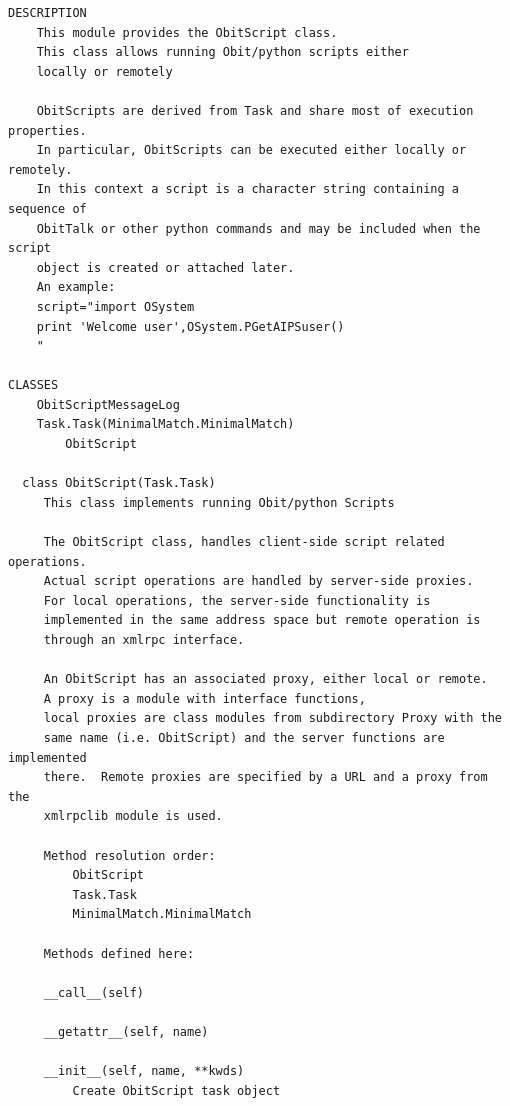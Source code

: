 \documentclass[11pt]{report}
\begin{document}
\begin{verbatim}
DESCRIPTION
    This module provides the ObitScript class.
    This class allows running Obit/python scripts either
    locally or remotely
    
    ObitScripts are derived from Task and share most of execution properties.
    In particular, ObitScripts can be executed either locally or remotely.
    In this context a script is a character string containing a sequence of
    ObitTalk or other python commands and may be included when the script
    object is created or attached later.
    An example:
    script="import OSystem
    print 'Welcome user',OSystem.PGetAIPSuser()
    "

CLASSES
    ObitScriptMessageLog
    Task.Task(MinimalMatch.MinimalMatch)
        ObitScript
    
  class ObitScript(Task.Task)
     This class implements running Obit/python Scripts
     
     The ObitScript class, handles client-side script related operations.
     Actual script operations are handled by server-side proxies.
     For local operations, the server-side functionality is
     implemented in the same address space but remote operation is
     through an xmlrpc interface.  
     
     An ObitScript has an associated proxy, either local or remote.
     A proxy is a module with interface functions,
     local proxies are class modules from subdirectory Proxy with the
     same name (i.e. ObitScript) and the server functions are implemented
     there.  Remote proxies are specified by a URL and a proxy from the
     xmlrpclib module is used.
     
     Method resolution order:
         ObitScript
         Task.Task
         MinimalMatch.MinimalMatch
     
     Methods defined here:
     
     __call__(self)
     
     __getattr__(self, name)
     
     __init__(self, name, **kwds)
         Create ObitScript task object
         

\end{verbatim}
\end{document}

